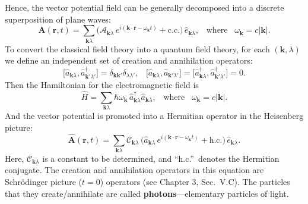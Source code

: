 \documentclass[pra,12pt]{revtex4}
\begin{document}
Hence, the vector potential field can be generally decomposed into a
discrete superposition of plane waves:
\begin{equation}
  \mathbf{A}(\mathbf{r},t) = \sum_{\mathbf{k}\lambda} 
  \Big(\mathcal{A}_{\mathbf{k}\lambda} \, e^{i(\mathbf{k}\cdot\mathbf{r} - \omega_{\mathbf{k}} t)}
  + \mathrm{c.c.}\Big)\, \hat{e}_{\mathbf{k}\lambda},
  \;\;\; \mathrm{where}
  \;\;\;\omega_{\mathbf{k}} = c|\mathbf{k}|.
\end{equation}
To convert the classical field theory into a quantum field theory, for
each $(\mathbf{k},\lambda)$ we define an independent set of creation
and annihilation operators:
\begin{equation}
  \big[\hat{a}_{\mathbf{k}\lambda}, \hat{a}_{\mathbf{k}'\lambda'}^\dagger\big]
  = \delta_{\mathbf{k}\mathbf{k}'} \delta_{\lambda\lambda'}, \;\;\;
  \big[\hat{a}_{\mathbf{k}\lambda}, \hat{a}_{\mathbf{k}'\lambda'}\big]
  = \big[\hat{a}_{\mathbf{k}\lambda}^\dagger, \hat{a}_{\mathbf{k}'\lambda'}^\dagger\big]
  = 0.
\end{equation}
Then the Hamiltonian for the electromagnetic field is
\begin{equation}
  \hat{H} = \sum_{\mathbf{k}\lambda} \hbar \omega_{\mathbf{k}} \,
  \hat{a}^\dagger_{\mathbf{k}\lambda} \hat{a}_{\mathbf{k}\lambda},
  \;\;\; \mathrm{where}
  \;\;\;\omega_{\mathbf{k}} = c|\mathbf{k}|.
\end{equation}
And the vector potential is promoted into a Hermitian operator in the
Heisenberg picture:
\begin{equation}
  \hat{\mathbf{A}}(\mathbf{r},t) = \sum_{\mathbf{k}\lambda} 
  \mathcal{C}_{\mathbf{k}\lambda}\,
  \Big(\hat{a}_{\mathbf{k}\lambda} \, e^{i(\mathbf{k}\cdot\mathbf{r} - \omega_{\mathbf{k}} t)}
  + \mathrm{h.c.}\Big)\, \hat{e}_{\mathbf{k}\lambda}.
\end{equation}
Here, $\mathcal{C}_{\mathbf{k}\lambda}$ is a constant to be
determined, and ``h.c.''~denotes the Hermitian conjugate.  The
creation and annihilation operators in this equation are Schr\"odinger
picture ($t = 0$) operators (see Chapter 3, Sec.~V.C).  The particles
that they create/annihilate are called \textbf{photons}---elementary
particles of light.
\end{document}

